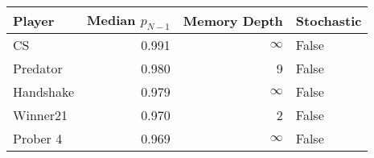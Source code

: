 \begin{tabular}{lrrl}
\toprule
    Player &  Median $p_{N-1}$ &  Memory Depth & Stochastic \\
\midrule
        CS &             0.991 &            \(\infty\) &      False \\
  Predator &             0.980 &             9 &      False \\
 Handshake &             0.979 &            \(\infty\) &      False \\
  Winner21 &             0.970 &             2 &      False \\
  Prober 4 &             0.969 &            \(\infty\) &      False \\
\bottomrule
\end{tabular}
